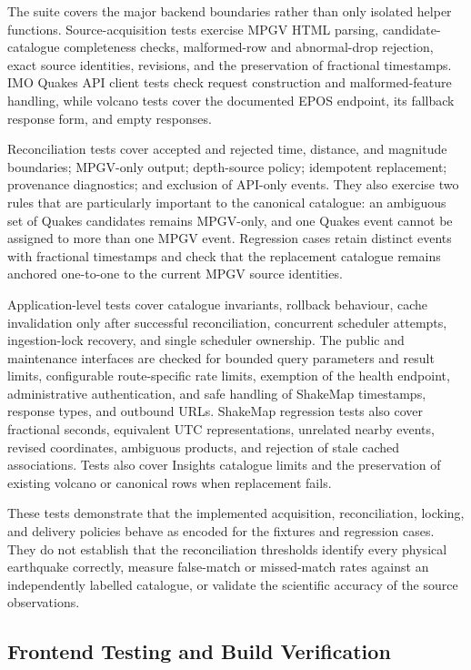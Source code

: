 \documentclass[12pt]{article}
\begin{document}
The suite covers the major backend boundaries rather than only isolated helper functions. Source-acquisition tests exercise MPGV HTML parsing, candidate-catalogue completeness checks, malformed-row and abnormal-drop rejection, exact source identities, revisions, and the preservation of fractional timestamps. IMO Quakes API client tests check request construction and malformed-feature handling, while volcano tests cover the documented EPOS endpoint, its fallback response form, and empty responses.

Reconciliation tests cover accepted and rejected time, distance, and magnitude boundaries; MPGV-only output; depth-source policy; idempotent replacement; provenance diagnostics; and exclusion of API-only events. They also exercise two rules that are particularly important to the canonical catalogue: an ambiguous set of Quakes candidates remains MPGV-only, and one Quakes event cannot be assigned to more than one MPGV event. Regression cases retain distinct events with fractional timestamps and check that the replacement catalogue remains anchored one-to-one to the current MPGV source identities.

Application-level tests cover catalogue invariants, rollback behaviour, cache invalidation only after successful reconciliation, concurrent scheduler attempts, ingestion-lock recovery, and single scheduler ownership. The public and maintenance interfaces are checked for bounded query parameters and result limits, configurable route-specific rate limits, exemption of the health endpoint, administrative authentication, and safe handling of ShakeMap timestamps, response types, and outbound URLs. ShakeMap regression tests also cover fractional seconds, equivalent UTC representations, unrelated nearby events, revised coordinates, ambiguous products, and rejection of stale cached associations. Tests also cover Insights catalogue limits and the preservation of existing volcano or canonical rows when replacement fails.

These tests demonstrate that the implemented acquisition, reconciliation, locking, and delivery policies behave as encoded for the fixtures and regression cases. They do not establish that the reconciliation thresholds identify every physical earthquake correctly, measure false-match or missed-match rates against an independently labelled catalogue, or validate the scientific accuracy of the source observations.

\subsection{Frontend Testing and Build Verification}
\end{document}
